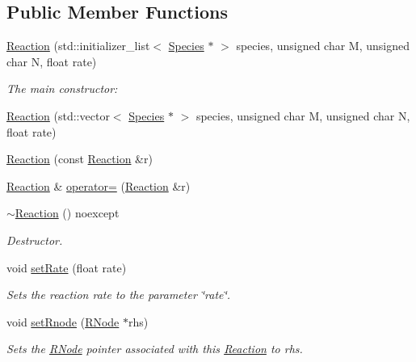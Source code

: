 \subsection*{Public Member Functions}
\begin{DoxyCompactItemize}
\item 
\hyperlink{classchem_1_1Reaction_a357e31612d0c232d22bb3673fffb75c2}{Reaction} (std\-::initializer\-\_\-list$<$ \hyperlink{classchem_1_1Species}{Species} $\ast$ $>$ species, unsigned char M, unsigned char N, float rate)
\begin{DoxyCompactList}\small\item\em The main constructor\-: \end{DoxyCompactList}\item 
\hyperlink{classchem_1_1Reaction_a229dd7e90ef4464e450b1a18c31c3f05}{Reaction} (std\-::vector$<$ \hyperlink{classchem_1_1Species}{Species} $\ast$ $>$ species, unsigned char M, unsigned char N, float rate)
\item 
\hyperlink{classchem_1_1Reaction_a6557de5f31aa20434edc8ff2c780a71e}{Reaction} (const \hyperlink{classchem_1_1Reaction}{Reaction} \&r)
\item 
\hyperlink{classchem_1_1Reaction}{Reaction} \& \hyperlink{classchem_1_1Reaction_ae0c7b46c61af874a03ce6d826884711b}{operator=} (\hyperlink{classchem_1_1Reaction}{Reaction} \&r)
\item 
\hyperlink{classchem_1_1Reaction_ae82cba47ed07ed6e12039a58bfd1eb49}{$\sim$\-Reaction} () noexcept
\begin{DoxyCompactList}\small\item\em Destructor. \end{DoxyCompactList}\item 
void \hyperlink{classchem_1_1Reaction_aad9d07693c386d626a9cd1eaf64ad507}{set\-Rate} (float rate)
\begin{DoxyCompactList}\small\item\em Sets the reaction rate to the parameter \char`\"{}rate\char`\"{}. \end{DoxyCompactList}\item 
void \hyperlink{classchem_1_1Reaction_a5a7d582d4c2f5a447da9844a0e4c5f97}{set\-Rnode} (\hyperlink{classchem_1_1RNode}{R\-Node} $\ast$rhs)
\begin{DoxyCompactList}\small\item\em Sets the \hyperlink{classchem_1_1RNode}{R\-Node} pointer associated with this \hyperlink{classchem_1_1Reaction}{Reaction} to rhs. \end{DoxyCompactList}\item 

\end{DoxyCompactItemize}
